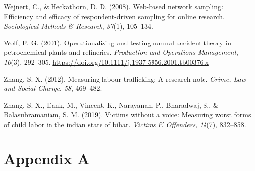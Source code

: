\documentclass[
  12pt,
]{article}
\newlength{\cslhangindent}
\newenvironment{CSLReferences}[2] %
 {\begin{list}{}{%
  \setlength{\itemindent}{0pt}
  \setlength{\leftmargin}{0pt}
  \setlength{\parsep}{0pt}
  \ifodd #1
   \setlength{\leftmargin}{\cslhangindent}
   \setlength{\itemindent}{-1\cslhangindent}
  \fi
  \setlength{\itemsep}{#2\baselineskip}}}
 {\end{list}}
\theoremstyle{plain}
\theoremstyle{definition}
\begin{document}
\begin{CSLReferences}{1}{0}
Wejnert, C., \& Heckathorn, D. D. (2008). Web-based network sampling:
Efficiency and efficacy of respondent-driven sampling for online
research. \emph{Sociological Methods \& Research}, \emph{37}(1),
105--134.

Wolf, F. G. (2001). Operationalizing and testing normal accident theory
in petrochemical plants and refineries. \emph{Production and Operations
Management}, \emph{10}(3), 292--305.
\url{https://doi.org/10.1111/j.1937-5956.2001.tb00376.x}

Zhang, S. X. (2012). Measuring labour trafficking: A research note.
\emph{Crime, Law and Social Change}, \emph{58}, 469--482.

Zhang, S. X., Dank, M., Vincent, K., Narayanan, P., Bharadwaj, S., \&
Balasubramaniam, S. M. (2019). Victims without a voice: Measuring worst
forms of child labor in the indian state of bihar. \emph{Victims \&
Offenders}, \emph{14}(7), 832--858.

\end{CSLReferences}

\newpage

\appendix

\section{Appendix A}\label{appendix-a}
\end{document}
